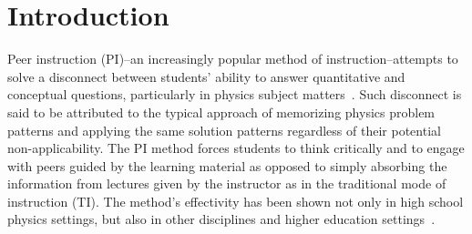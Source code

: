 \documentclass[twocolumn,secnumarabic,amssymb, nobibnotes, aps, prd]{revtex4-2}
\begin{document}
\maketitle
\tableofcontents

\section{Introduction}

    Peer instruction (PI)--an increasingly popular method of instruction--attempts to solve a disconnect between students' ability to answer quantitative and conceptual questions, particularly in physics subject matters~\cite{mazur1997peer,mazur1999}.
	Such disconnect is said to be attributed to the typical approach of memorizing physics problem patterns and applying the same solution patterns regardless of their potential non-applicability.
    The PI method forces students to think critically and to engage with peers guided by the learning material as opposed to simply absorbing the information from lectures given by the instructor as in the traditional mode of instruction (TI).
    The method's effectivity has been shown not only in high school physics settings, but also in other disciplines and higher education settings~\cite{johnson2008active,fagen2002peer}.


    
\end{document}
